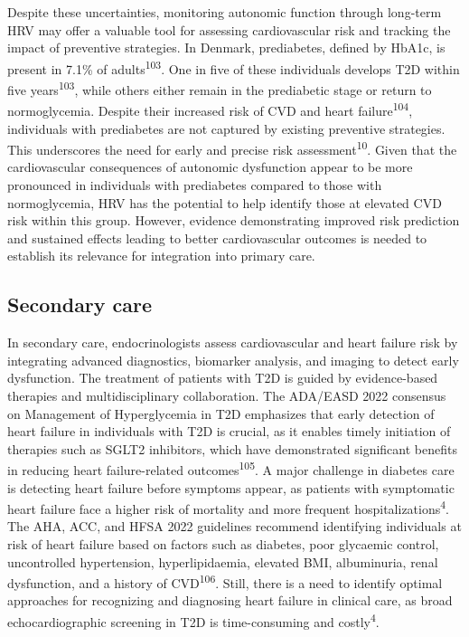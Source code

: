 \documentclass[
  a4paper,
  headsepline=true,
  open=any]{scrbook}
\begin{document}
Despite these uncertainties, monitoring autonomic function through
long-term HRV may offer a valuable tool for assessing cardiovascular
risk and tracking the impact of preventive strategies. In Denmark,
prediabetes, defined by HbA1c, is present in 7.1\% of
adults\textsuperscript{103}. One in five of these individuals develops
T2D within five years\textsuperscript{103}, while others either remain
in the prediabetic stage or return to normoglycemia. Despite their
increased risk of CVD and heart failure\textsuperscript{104},
individuals with prediabetes are not captured by existing preventive
strategies. This underscores the need for early and precise risk
assessment\textsuperscript{10}. Given that the cardiovascular
consequences of autonomic dysfunction appear to be more pronounced in
individuals with prediabetes compared to those with normoglycemia, HRV
has the potential to help identify those at elevated CVD risk within
this group. However, evidence demonstrating improved risk prediction and
sustained effects leading to better cardiovascular outcomes is needed to
establish its relevance for integration into primary care.

\hypertarget{secondary-care}{%
\subsection{Secondary care}\label{secondary-care}}

In secondary care, endocrinologists assess cardiovascular and heart
failure risk by integrating advanced diagnostics, biomarker analysis,
and imaging to detect early dysfunction. The treatment of patients with
T2D is guided by evidence-based therapies and multidisciplinary
collaboration. The ADA/EASD 2022 consensus on Management of
Hyperglycemia in T2D emphasizes that early detection of heart failure in
individuals with T2D is crucial, as it enables timely initiation of
therapies such as SGLT2 inhibitors, which have demonstrated significant
benefits in reducing heart failure-related
outcomes\textsuperscript{105}. A major challenge in diabetes care is
detecting heart failure before symptoms appear, as patients with
symptomatic heart failure face a higher risk of mortality and more
frequent hospitalizations\textsuperscript{4}. The AHA, ACC, and HFSA
2022 guidelines recommend identifying individuals at risk of heart
failure based on factors such as diabetes, poor glycaemic control,
uncontrolled hypertension, hyperlipidaemia, elevated BMI, albuminuria,
renal dysfunction, and a history of CVD\textsuperscript{106}. Still,
there is a need to identify optimal approaches for recognizing and
diagnosing heart failure in clinical care, as broad echocardiographic
screening in T2D is time-consuming and costly\textsuperscript{4}.
\end{document}
